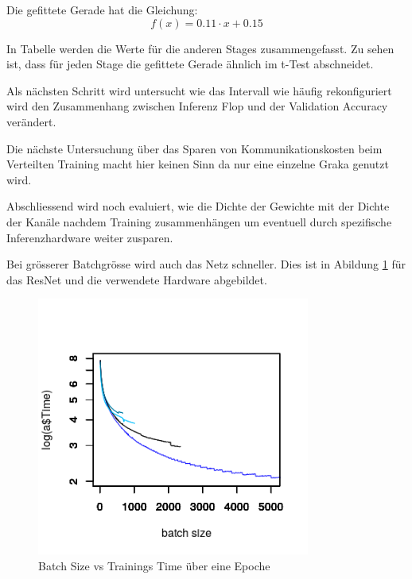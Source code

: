 Die gefittete Gerade hat die Gleichung: $$ f(x)=0.11 \cdot x +  0.15 $$


In Tabelle  werden die Werte für die anderen Stages zusammengefasst. Zu sehen ist, dass für jeden Stage die gefittete Gerade ähnlich im t-Test abschneidet.







Als nächsten Schritt wird untersucht wie das Intervall wie häufig rekonfiguriert wird den Zusammenhang zwischen Inferenz Flop und der Validation Accuracy verändert.


Die nächste Untersuchung über das Sparen von Kommunikationskosten beim Verteilten Training macht hier keinen Sinn da nur eine einzelne Graka genutzt wird.


Abschliessend wird noch evaluiert, wie die Dichte der Gewichte mit der Dichte der Kanäle nachdem Training zusammenhängen um eventuell durch spezifische Inferenzhardware weiter zusparen.





Bei grösserer Batchgrösse wird auch das Netz schneller. Dies ist in Abildung \ref{fig:batchVsTime} für das ResNet und die verwendete Hardware abgebildet.

\begin{figure}[h]
 \centering
 \includegraphics[width=0.8\textwidth]{KapitelPartB/Images/batchSizevsTime.png}
 \caption{Batch Size vs Trainings Time über eine Epoche}
 \label{fig:batchVsTime}
\end{figure}


